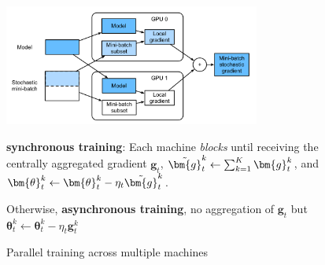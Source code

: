 \begin{figure}[htpb]
    \centering
    \includegraphics[width=0.75\textwidth]{figs/paralleltrain.png}
    \caption{Parallel training across multiple machines}
    \label{fig:paralleltrain}
    {\footnotesize 
    \textbf{synchronous training}: Each machine \textit{blocks} until receiving the centrally aggregated gradient $\bm{g}_t$, 
    $\Tilde{\bm{g}}_t^k\leftarrow\sum_{k=1}^K\bm{g}_t^k$, 
    and $\bm{\theta}_t^k\leftarrow\bm{\theta}_t^k-\eta_t\Tilde{\bm{g}}_t^k$.
    
    Otherwise, \textbf{asynchronous training}, no aggregation of $\bm{g}_t$ 
    but $\bm{\theta}_t^k\leftarrow\bm{\theta}_t^k-\eta_t\bm{g}_t^k$}
\end{figure}